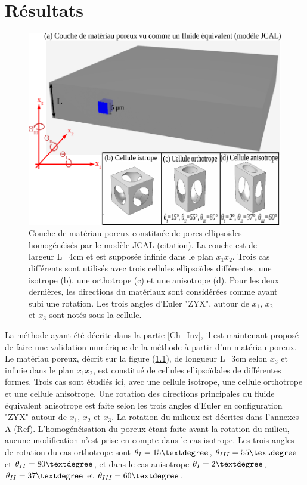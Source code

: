 \documentclass[12pt]{report}
\begin{document}
\chapter{Résultats}
\label{Ch_Res}
  \begin{figure}[ht!]
        \centering
        \includegraphics{Material_2.pdf}
        \caption{Couche de matériau poreux constituée de pores ellipsoïdes homogénéisés par le modèle JCAL (citation). La couche est de largeur L=4cm et est supposée infinie dans le plan $x_1x_2$. Trois cas différents sont utilisés avec trois cellules ellipsoïdes différentes, une isotrope (b), une orthotrope (c) et une anisotrope (d). Pour les deux dernières, les directions du matériaux sont considérées comme ayant subi une rotation. Les trois angles d'Euler "ZYX", autour de $x_1$, $x_2$ et $x_3$ sont notés sous la cellule. }
        \label{Porous_Mat}
    \end{figure}

    La méthode ayant été décrite dans la partie \ref{Ch_Inv}, il est maintenant proposé de faire une validation numérique de la méthode à partir d'un matériau poreux. Le matériau poreux, décrit sur la figure (\ref{Porous_Mat}), de longueur L=3cm selon $x_3$ et infinie dans le plan $x_1x_2$, est constitué de cellules ellipsoïdales de différentes formes. Trois cas sont étudiés ici, avec une cellule isotrope, une cellule orthotrope et une cellule anisotrope. Une rotation des directions principales du fluide équivalent anisotrope est faite selon les trois angles d'Euler en configuration "ZYX" autour de $x_1$, $x_2$ et $x_3$. La rotation du milieux est décrites dans l'annexes A (Ref). L'homogénéisation du poreux étant faite avant la rotation du milieu, aucune modification n'est prise en compte dans le cas isotrope. Les trois angles de rotation du cas orthotrope sont $\theta_I=15\textdegree$, $\theta_{III}=55\textdegree$ et $\theta_{II}=80\textdegree$, et dans le cas anisotrope $\theta_I=2\textdegree$, $\theta_{II}=37\textdegree$ et $\theta_{III}=60\textdegree$.
    
\end{document}
